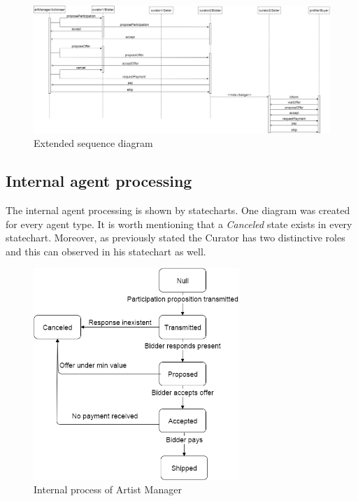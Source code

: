 \documentclass[a4paper,11pt]{report}
\begin{document}
     \begin{figure}[ht!]
    \centering
    \includegraphics[width=\textwidth]{media/extended_seq_diag.png}
    \caption{Extended sequence diagram}
    \label{figure:extSeqDiag}
   \end{figure}
  
  \subsection{Internal agent processing}
  The internal agent processing is shown by statecharts. One diagram was created for every
  agent type. It is worth mentioning that a \textit{Canceled} state exists in every
  statechart. Moreover, as previously stated the Curator has two distinctive roles
  and this can observed in his statechart as well.
  
   \begin{figure}[ht!]
    \centering
    \includegraphics[height=8cm]{media/statechart_artistM.png}
    \caption{Internal process of Artist Manager}
    \label{figure:statechartArtistM}
   \end{figure}
   
\end{document}
